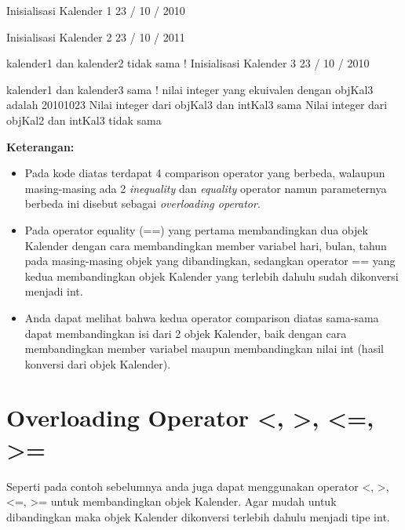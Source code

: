 \begin{lcverbatim}
Inisialisasi Kalender 1
23 / 10 / 2010

Inisialisasi Kalender 2
23 / 10 / 2011

kalender1 dan kalender2 tidak sama !
Inisialisasi Kalender 3
23 / 10 / 2010

kalender1 dan kalender3 sama !
nilai integer yang ekuivalen dengan objKal3 adalah 20101023
Nilai integer dari objKal3 dan intKal3 sama
Nilai integer dari objKal2 dan intKal3 tidak sama
\end{lcverbatim}

\textbf{Keterangan:}

\begin{itemize}
\tightlist
\item
  Pada kode diatas terdapat 4 comparison operator yang berbeda, walaupun
  masing-masing ada 2 \emph{inequality} dan \emph{equality} operator
  namun parameternya berbeda ini disebut sebagai \emph{overloading
  operator}.
\item
  Pada operator equality (==) yang pertama membandingkan dua objek
  Kalender dengan cara membandingkan member variabel hari, bulan, tahun
  pada masing-masing objek yang dibandingkan, sedangkan operator == yang
  kedua membandingkan objek Kalender yang terlebih dahulu sudah
  dikonversi menjadi int.
\item
  Anda dapat melihat bahwa kedua operator comparison diatas sama-sama
  dapat membandingkan isi dari 2 objek Kalender, baik dengan cara
  membandingkan member variabel maupun membandingkan nilai int (hasil
  konversi dari objek Kalender).
\end{itemize}

\section{Overloading Operator \textless{}, \textgreater{},
\textless{}=, \textgreater{}=}\label{overloading-operator}

Seperti pada contoh sebelumnya anda juga dapat menggunakan operator
\textless{}, \textgreater{}, \textless{}=, \textgreater{}= untuk
membandingkan objek Kalender. Agar mudah untuk dibandingkan maka objek
Kalender dikonversi terlebih dahulu menjadi tipe int.

